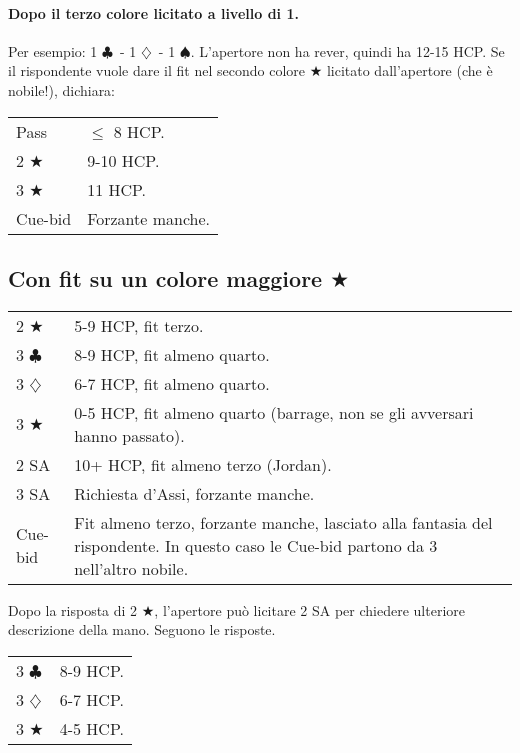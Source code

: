\documentclass[a4paper,10pt]{article}
\renewcommand{\c}{$\clubsuit$\xspace}
\renewcommand{\d}{$\diamondsuit$\xspace}
\newcommand{\s}{$\spadesuit$\xspace}
\renewcommand{\j}{$\bigstar$\xspace}
\newcommand{\sa}{SA\xspace}
\newcommand{\smallspace}{\vskip0.3cm}
\newcommand{\note}[1]{\textcolor{red}{#1}}
\newenvironment{twocol}
  {\smallspace\noindent\begin{tabular}{l p{0.78\textwidth}}}
  {\end{tabular}\smallspace}
\begin{document}
\paragraph{Dopo il terzo colore licitato a livello di 1.} Per esempio: 1 \c\ - 1 \d\ - 1 \s.
L'apertore non ha rever, quindi ha 12-15 HCP.
Se il rispondente vuole dare il fit nel secondo colore \j licitato dall'apertore (che è nobile!), dichiara:
\begin{twocol}
 Pass & $\leq$ 8 HCP.\\
 2 \j  & 9-10 HCP.\\
 3 \j & 11 HCP.\\
 Cue-bid  & Forzante manche.\\
\end{twocol}



\subsection{Con fit su un colore maggiore \j}
\begin{twocol}
 2 \j  & 5-9 HCP, fit terzo.\\
 3 \c  & 8-9 HCP, fit almeno quarto.\\
 3 \d  & 6-7 HCP, fit almeno quarto.\\
 3 \j  & 0-5 HCP, fit almeno quarto (barrage, non se gli avversari hanno passato).\\
 2 \sa & 10+ HCP, fit almeno terzo (Jordan).\\
 3 \sa & Richiesta d'Assi, forzante manche. \\
 Cue-bid & Fit almeno terzo, forzante manche, lasciato alla fantasia del rispondente. In questo caso le Cue-bid partono da 3 nell'altro nobile.
\end{twocol}
Dopo la risposta di 2 \j, l'apertore può licitare 2 \sa per chiedere ulteriore descrizione della mano. Seguono le risposte.

\begin{twocol}
	3 \c & 8-9 HCP. \\
	3 \d & 6-7 HCP. \\
	3 \j & 4-5 HCP.
\end{twocol}
\end{document}
